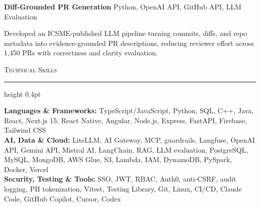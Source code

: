 \documentclass[letterpaper,11pt]{article}
\newcommand{\resumesection}[1]{%
  \par\vspace{2pt}%
  {\large\scshape #1}\par\vspace{2pt}%
  \hrule height 0.4pt\vspace{2pt}%
}
\newcommand{\projectHeading}[2]{
  \textbf{#1} \hfill #2
}
\begin{document}
\vspace{-4pt}
\projectHeading{Diff-Grounded PR Generation}{Python, OpenAI API, GitHub API, LLM Evaluation}
\begin{tightitemize}
  \item Developed an ICSME-published LLM pipeline turning commits, diffs, and repo metadata into evidence-grounded PR descriptions, reducing reviewer effort across 1,450 PRs with correctness and clarity evaluation.
\end{tightitemize}

\resumesection{Technical Skills}
\textbf{Languages \& Frameworks:} TypeScript/JavaScript, Python, SQL, C++, Java, React, Next.js 15, React Native, Angular, Node.js, Express, FastAPI, Firebase, Tailwind CSS\\
\textbf{AI, Data \& Cloud:} LiteLLM, AI Gateway, MCP, guardrails, Langfuse, OpenAI API, Gemini API, Mistral AI, LangChain, RAG, LLM evaluation, PostgreSQL, MySQL, MongoDB, AWS Glue, S3, Lambda, IAM, DynamoDB, PySpark, Docker, Vercel\\
\textbf{Security, Testing \& Tools:} SSO, JWT, RBAC, Auth0, anti-CSRF, audit logging, PII tokenization, Vitest, Testing Library, Git, Linux, CI/CD, Claude Code, GitHub Copilot, Cursor, Codex
\end{document}
